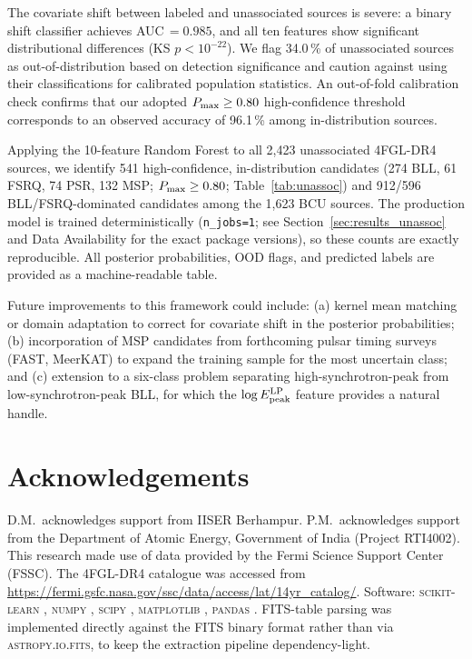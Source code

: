 \documentclass[fleqn,12pt]{article}
\newcommand{\fgl}{4FGL-DR4}
\newcommand{\Epeak}{E^{\rm LP}_{\rm peak}}
\begin{document}
The covariate shift between labeled and unassociated sources is
severe: a binary shift classifier achieves AUC\,$= 0.985$, and all
ten features show significant distributional differences (KS
$p < 10^{-22}$). We flag 34.0\,\% of unassociated sources as
out-of-distribution based on detection significance and caution
against using their classifications for calibrated population
statistics. An out-of-fold calibration check confirms that our
adopted $P_{\rm max}\geq0.80$ high-confidence threshold corresponds to
an observed accuracy of 96.1\,\% among in-distribution sources.

Applying the 10-feature Random Forest to all 2,423 unassociated
\fgl{} sources, we identify 541 high-confidence, in-distribution
candidates (274 BLL, 61 FSRQ, 74 PSR, 132 MSP; $P_{\rm max} \geq 0.80$;
Table~\ref{tab:unassoc}) and 912/596 BLL/FSRQ-dominated candidates
among the 1,623 BCU sources. The production model is trained
deterministically (\texttt{n\_jobs=1}; see
Section~\ref{sec:results_unassoc} and Data Availability for the exact
package versions), so these counts are exactly reproducible. All
posterior probabilities, OOD flags, and predicted labels are provided
as a machine-readable table.

Future improvements to this framework could include: (a) kernel
mean matching or domain adaptation to correct for covariate shift
in the posterior probabilities; (b) incorporation of MSP candidates
from forthcoming pulsar timing surveys (FAST, MeerKAT) to expand
the training sample for the most uncertain class; and (c) extension
to a six-class problem separating high-synchrotron-peak from
low-synchrotron-peak BLL, for which the $\log\Epeak$ feature provides
a natural handle.

\section*{Acknowledgements}
D.M.\ acknowledges support from IISER Berhampur. P.M.\ acknowledges
support from the Department of Atomic Energy, Government of India
(Project RTI4002). This research made use of data provided by the
Fermi Science Support Center (FSSC). The \fgl{} catalogue was
accessed from \url{https://fermi.gsfc.nasa.gov/ssc/data/access/lat/14yr_catalog/}.
Software: \textsc{scikit-learn} \citep{Pedregosa2011},
\textsc{numpy} \citep{Harris2020}, \textsc{scipy} \citep{Virtanen2020},
\textsc{matplotlib} \citep{Hunter2007}, \textsc{pandas} \citep{McKinney2010}.
FITS-table parsing was implemented directly against the FITS binary
format rather than via \textsc{astropy.io.fits}, to keep the extraction
pipeline dependency-light.
\end{document}
